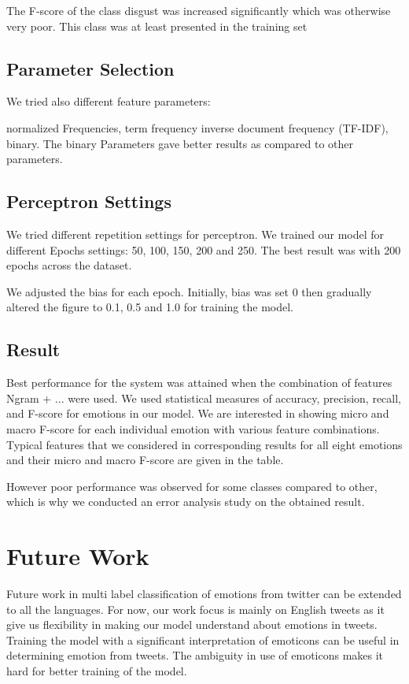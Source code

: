 \documentclass[11pt]{article}
\begin{document}
  
  The F-score of the class disgust was increased significantly which was otherwise very poor. This class was at least presented in the training set
  
  \subsection{Parameter Selection}
  
  
  We tried also different feature parameters:
  
  
  normalized Frequencies, term frequency inverse document frequency (TF-IDF), binary. The binary Parameters gave better results as compared to other
  parameters.
  
  
  \subsection{Perceptron Settings}
  We tried different repetition settings for perceptron. We trained our model for different Epochs settings:
  50, 100, 150, 200 and 250. The best result was with 200 epochs across the dataset.
  
  We adjusted the bias for each epoch. Initially, bias was set 0 then gradually altered the figure to 0.1, 0.5 and 1.0 for training the model.
  
  \subsection{Result}
  
  Best performance for the system was attained when the combination of features Ngram + ... were used. We used statistical measures of accuracy,
  precision, recall, and F-score for emotions in our model. We are interested in showing micro and macro F-score for each individual emotion with
  various feature combinations.
  Typical features that we considered in corresponding results for all eight
  emotions and their micro and macro F-score are given in the table.
  
  However poor performance was observed for some classes compared to other, which is why we conducted an error analysis study on the obtained result.
  
  \section{Future Work}
  
  Future work in multi label classification of emotions from twitter can be extended to all the languages. For now, our work focus is mainly on
  English tweets as it give us flexibility in making our model understand about emotions in tweets. Training the model with a significant interpretation
  of emoticons can be useful in determining emotion from tweets. The ambiguity in use of emoticons makes it hard for better training of the model.
  
\end{document}
